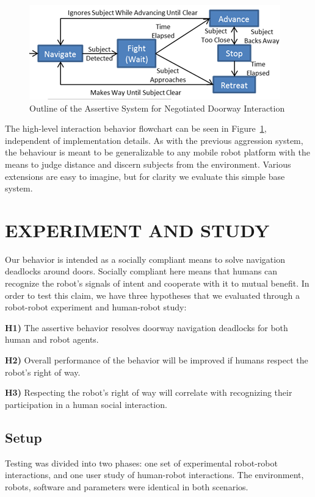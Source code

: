 \documentclass[letterpaper, 10 pt, conference]{ieeeconf}  %
\begin{document}
    \begin{figure}
      \centering
      \includegraphics{assertive_behavior.png}
      \caption{Outline of the Assertive System for Negotiated Doorway Interaction}
      \label{fig:Assertive}
   \end{figure}


The high-level interaction behavior flowchart can be seen in Figure~\ref{fig:Assertive}, independent of implementation details. As with the previous aggression system, the behaviour is meant to be generalizable to any mobile robot platform with the means to judge distance and discern subjects from the environment. Various extensions are easy to imagine, but for clarity we evaluate this simple base system.

\section{EXPERIMENT AND STUDY}

Our behavior is intended as a socially compliant means to solve navigation deadlocks around doors. Socially compliant here means that humans can recognize the robot's signals of intent and cooperate with it to mutual benefit. In order to test this claim, we have three hypotheses that we evaluated through a robot-robot experiment and human-robot study:

\textbf{H1)} The assertive behavior resolves doorway navigation deadlocks for both human and robot agents.

\textbf{H2)} Overall performance of the behavior will be improved if humans respect the robot's right of way.

\textbf{H3)} Respecting the robot's right of way will correlate with recognizing their participation in a human social interaction.


\subsection{Setup}

Testing was divided into two phases: one set of experimental robot-robot interactions, and one user study of human-robot interactions. The environment, robots, software and parameters were identical in both scenarios.
\end{document}
